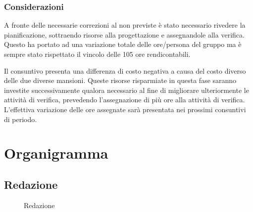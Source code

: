 \subsubsection{Considerazioni}
A fronte delle necessarie correzioni al \PdQ{} non previste è stato necessario rivedere la pianificazione, sottraendo risorse alla progettazione e assegnandole alla verifica. Questo ha portato ad una variazione totale delle ore/persona del gruppo ma è sempre stato rispettato il vincolo delle 105 ore rendicontabili. 

Il consuntivo presenta una differenza di costo negativa a causa del costo diverso delle due diverse mansioni. Queste risorse risparmiate in questa fase saranno investite successivamente qualora necessario al fine di migliorare ulteriormente le attività di verifica, prevedendo l'assegnazione di più ore alla attività di verifica. L'effettiva variazione delle ore assegnate sarà presentata nei prossimi consuntivi di periodo.









\section{Organigramma}	\label{sec:organigramma}
\subsection{Redazione}

\begin{figure}[H]
\caption{Redazione}
\end{figure}


